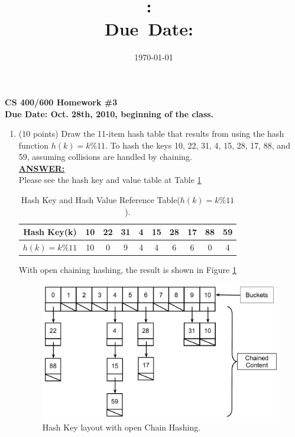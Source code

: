 \documentclass{article}
\title{\textmd{\textbf{\hmwkClass:\
      \hmwkTitle}}\\\normalsize\small{Due\ Date:\
    \hmwkDueDate}\\}
\date{\today}
\author{\textsc{\hmwkAuthorName}}
\newcommand{\answer}{\textbf{\\\underline{ANSWER:}\\}}
\begin{document}
\begin{center}
\textbf{{\LARGE CS 400/600  Homework \#3} \\
Due Date: Oct. 28th, 2010, beginning of the class.}
\end{center}

\begin{enumerate}
\item(10 points) Draw the 11-item hash table that results from using
  the hash function $h(k)= k \% 11$. To hash the keys 10, 22, 31, 4,
  15, 28, 17, 88, and 59, assuming collisions are handled by
  chaining. 
\answer Please see the hash key and value table at Table
\ref{tbl:hashvalue}
\begin{table}[H]
  \begin{center}
    \begin{tabular}{|c|c|c|c|c|c|c|c|c|c|} 
      \hline Hash Key(k)&10&22&31&4&15&28&17&88&59 \\
      \hline $h(k)=k\%11$&10&0 &9 &4&4 &6 &6 &0 &4 \\
      \hline
    \end{tabular}
    \caption{Hash Key and Hash Value Reference
      Table($h(k)=k\%11$). \label{tbl:hashvalue}}  
    \vspace{-15pt}
  \end{center}
\end{table}
With open chaining hashing, the result is shown in Figure
\ref{tbl:chainhash} \\ 

\begin{figure}[H]
  \vspace{-15pt}
  \begin{center}
    \includegraphics[scale=0.7]{chained_hashing}
    \caption{Hash Key layout with open Chain
      Hashing. \label{tbl:chainhash}}
    \vspace{-15pt}
  \end{center}
\end{figure}


\end{enumerate}
\end{document}
